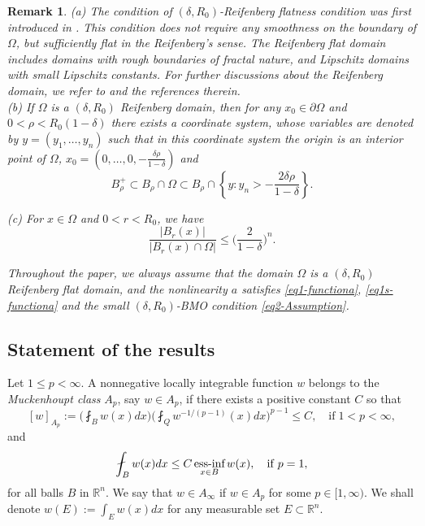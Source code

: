 \documentclass[a4paper,10pt]{amsart}
\newtheorem{rem}[thm]{Remark}
\newcommand{\f}{\frac}
\newcommand{\Om}{\Omega}
\begin{document}
\begin{rem}\label{rem1}
	{\rm (a)} The condition of  $(\delta, R_0)$-Reifenberg flatness condition was first introduced in \cite{R}. This condition does not require any smoothness on the boundary of $\Om$, but
	sufficiently flat in the Reifenberg's sense. The Reifenberg flat domain includes domains with rough boundaries of fractal
	nature, and Lipschitz domains with small Lipschitz constants.
	For further discussions about the Reifenberg domain, we refer to \cite{R, DT, Toro} and the references therein. \\
	
	
	{\rm (b)} If $\Om$ is a $(\delta, R_0)$ Reifenberg domain, then for any $x_0\in \partial \Om$ and $0<\rho<R_0(1-\delta)$ there exists a coordinate system, whose variables are denoted by $y=(y_1,\ldots, y_n)$ such that in this coordinate system the origin is an interior point of $\Om$, $x_0=(0,\ldots, 0, -\f{\delta \rho}{1-\delta})$ and
	$$
	B_{\rho}^+\subset B_{\rho}\cap \Om\subset B_{\rho}\cap  \left\{y: y_n>-\f{2\delta \rho}{1-\delta}\right\}.
	$$
	
	
	{\rm (c)} For $x\in \Om$ and $0<r<R_0$, we have
	\begin{equation}
	\label{eq1-Reifenberg domain}
	\f{|B_r(x)|}{|B_r(x)\cap \Om|}\leq \Big(\f{2}{1-\delta}\Big)^n.
	\end{equation}
\end{rem}

\bigskip

{\it Throughout the paper, we always assume that the domain $\Om$ is a $(\delta, R_0)$ Reifenberg flat domain, and the nonlinearity $a$ satisfies \eqref{eq1-functiona}, \eqref{eq1s-functiona} and the small $(\delta, R_0)$-BMO condition \eqref{eq2-Assumption}.}
\subsection{Statement of the results}
Let $1\leq p<\infty$. A nonnegative locally integrable function $w$ belongs to the {\sl Muckenhoupt class} $A_p$, say $w\in A_p$, if there exists a positive constant $C$ so that
$$[w]_{A_p}:=\Big(\fint_B w(x)dx\Big)\Big(\fint_Q w^{-1/(p-1)}(x)dx\Big)^{p-1}\leq C, \quad\mbox{if}\; 1<p<\infty,$$
and
$$
\fint_B w(x)dx\leq C \mathop{\mbox{ess-inf}}\limits_{x\in B}w(x),\quad{\rm if}\; p=1,
$$
for all balls $B$ in $\mathbb R^n$. We say that $w\in A_\infty$ if $w\in A_p$ for some $p\in [1,\infty)$. We shall denote $w(E) :=\int_E w(x)dx$ for any measurable set $E \subset \mathbb{R}^n$.
\end{document}
